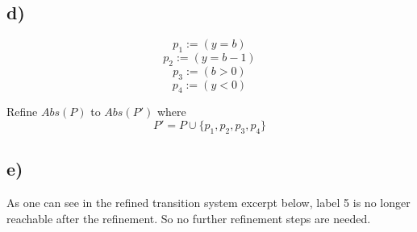 \documentclass[fleqn,12pt]{article}
\begin{document}
\subsection*{d)}
$$p_1 := (y = b)$$
$$p_2 := (y = b - 1)$$
$$p_3 := (b>0)$$
$$p_4 := (y<0)$$

Refine $Abs(P)$ to $Abs(P')$ where
$$P' = P \cup \lbrace p_1,p_2,p_3,p_4 \rbrace $$
\subsection*{e)}
As one can see in the refined transition system excerpt below, label 5 is no longer reachable after the refinement. So no further refinement steps are needed.
\end{document}
